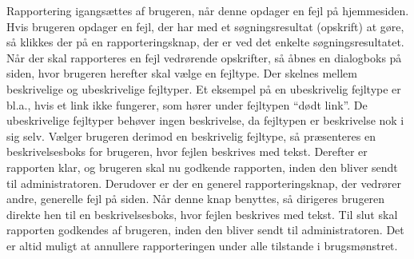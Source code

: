 {Rapportering igangsættes af brugeren, når denne opdager en fejl på hjemmesiden. Hvis brugeren opdager en fejl, der har med et søgningsresultat (opskrift) at gøre, så klikkes der på en rapporteringsknap, der er ved det enkelte søgningsresultatet. Når der skal rapporteres en fejl vedrørende opskrifter, så åbnes en dialogboks på siden, hvor brugeren herefter skal vælge en fejltype. Der skelnes mellem beskrivelige og ubeskrivelige fejltyper. Et eksempel på en ubeskrivelig fejltype er bl.a., hvis et link ikke fungerer, som hører under fejltypen “dødt link”. De ubeskrivelige fejltyper behøver ingen beskrivelse, da fejltypen er beskrivelse nok i sig selv. Vælger brugeren derimod en beskrivelig fejltype, så præsenteres en beskrivelsesboks for brugeren, hvor fejlen beskrives med tekst. Derefter er rapporten klar, og brugeren skal nu godkende rapporten, inden den bliver sendt til administratoren.
Derudover er der en generel rapporteringsknap, der vedrører andre, generelle fejl på siden. Når denne knap benyttes, så dirigeres brugeren direkte hen til en beskrivelsesboks, hvor fejlen beskrives med tekst. Til slut skal rapporten godkendes af brugeren, inden den bliver sendt til administratoren. Det er altid muligt at annullere rapporteringen under alle tilstande i brugsmønstret.}
{}
{}
